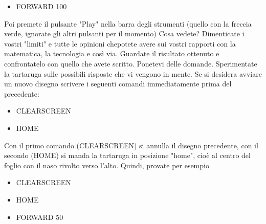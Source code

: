 \begin{scriptsize}
\begin{minipage}{0.45\textwidth}
\begin{itemize}[itemsep=-3pt,parsep=2pt]
\item[] \hspace{0.5cm} FORWARD 100
\end{itemize}
\end{minipage}
\end{scriptsize}

\vskip 1cm

Poi premete il pulsante "Play" nella barra degli strumenti (quello con la freccia verde, ignorate gli altri pulsanti per il momento)
Cosa vedete?  Dimenticate i vostri "limiti" e tutte le opinioni chepotete avere sui vostri rapporti con la matematica, la tecnologia e così via. Guardate il risultato ottenuto e confrontatelo con quello che avete scritto. Ponetevi delle domande. Sperimentate la tartaruga sulle possibili risposte che vi vengono in mente. Se si desidera avviare un nuovo disegno scrivere i seguenti comandi immediatamente prima del precedente:

\vskip 1cm

\begin{scriptsize}
\begin{minipage}{0.45\textwidth}
\begin{itemize}[itemsep=-3pt,parsep=2pt]
\item[] \hspace{0.5cm} CLEARSCREEN 
\item[] \hspace{0.5cm} HOME
\end{itemize}
\end{minipage}
\end{scriptsize}

\vskip 1cm

Con il primo comando (CLEARSCREEN) si annulla il disegno precedente, con il secondo (HOME) si manda la tartaruga in posizione "home", cioè al centro del foglio con il naso rivolto verso l'alto. Quindi, provate per esempio

\vskip 1cm

\begin{scriptsize}
\begin{minipage}{0.45\textwidth}
\begin{itemize}[itemsep=-3pt,parsep=2pt]
\item[] \hspace{0.5cm} CLEARSCREEN 
\item[] \hspace{0.5cm} HOME
\item[] \hspace{0.5cm} FORWARD 50
\end{itemize}
\end{minipage}
\end{scriptsize}

